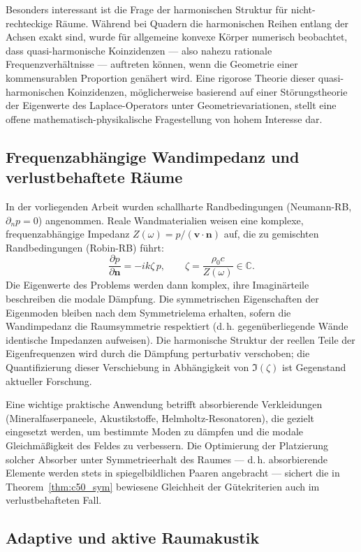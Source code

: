 ﻿\documentclass[12pt, a4paper]{article}
\theoremstyle{definition}
\theoremstyle{remark}
\newcommand{\pfrac}[2]{\frac{\partial #1}{\partial #2}}
\begin{document}
Besonders interessant ist die Frage der harmonischen Struktur für
nicht-rechteckige Räume. Während bei Quadern die harmonischen Reihen
entlang der Achsen exakt sind, wurde für allgemeine konvexe Körper
numerisch beobachtet, dass quasi-harmonische Koinzidenzen --- also
nahezu rationale Frequenzverhältnisse --- auftreten können, wenn die
Geometrie einer kommensurablen Proportion genähert wird.
Eine rigorose Theorie dieser quasi-harmonischen Koinzidenzen, möglicherweise
basierend auf einer Störungstheorie der Eigenwerte des Laplace-Operators
unter Geometrievariationen, stellt eine offene mathematisch-physikalische
Fragestellung von hohem Interesse dar.

\subsection{Frequenzabhängige Wandimpedanz und verlustbehaftete Räume}

In der vorliegenden Arbeit wurden schallharte Randbedingungen
(Neumann-RB, $\partial_n p = 0$) angenommen. Reale Wandmaterialien
weisen eine komplexe, frequenzabhängige Impedanz
$Z(\omega) = p/(\mathbf{v}\cdot\mathbf{n})$ auf, die zu
gemischten Randbedingungen (Robin-RB) führt:
\[
  \pfrac{p}{\mathbf{n}} = -ik\zeta\,p, \qquad
  \zeta = \frac{\rho_0 c}{Z(\omega)} \in \mathbb{C}.
\]
Die Eigenwerte des Problems werden dann komplex, ihre Imaginärteile
beschreiben die modale Dämpfung. Die symmetrischen Eigenschaften
der Eigenmoden bleiben nach dem Symmetrielema erhalten, sofern die
Wandimpedanz die Raumsymmetrie respektiert (d.\,h. gegenüberliegende
Wände identische Impedanzen aufweisen). Die harmonische Struktur
der reellen Teile der Eigenfrequenzen wird durch die Dämpfung
perturbativ verschoben; die Quantifizierung dieser Verschiebung
in Abhängigkeit von $\Im(\zeta)$ ist Gegenstand aktueller Forschung.

Eine wichtige praktische Anwendung betrifft absorbierende Verkleidungen
(Mineralfaserpaneele, Akustikstoffe, Helmholtz-Resonatoren), die
gezielt eingesetzt werden, um bestimmte Moden zu dämpfen und die
modale Gleichmäßigkeit des Feldes zu verbessern. Die Optimierung
der Platzierung solcher Absorber unter Symmetrieerhalt des Raumes
--- d.\,h. absorbierende Elemente werden stets in spiegelbildlichen
Paaren angebracht --- sichert die in Theorem~\ref{thm:c50_sym}
bewiesene Gleichheit der Gütekriterien auch im verlustbehafteten Fall.

\subsection{Adaptive und aktive Raumakustik}
\end{document}
